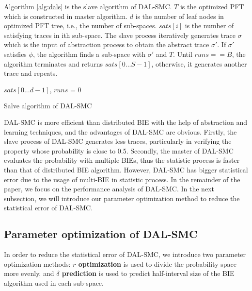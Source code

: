 Algorithm \ref{alg:dals} is the slave algorithm of DAL-SMC. $T$ is the optimized PFT which is constructed in master algorithm. $d$ is the number of leaf nodes in optimized PFT tree, i.e., the number of sub-spaces. $sats[i]$ is the number of satisfying traces in ith sub-space. The slave process iteratively generates trace $\sigma$ which is the input of abstraction process to obtain the abstract trace $\sigma'$. If $\sigma'$ satisfies $\phi$, the algorithm finds a sub-space with $\sigma'$ and $T$. Until $runs == B$, the algorithm terminates and returns $sats[0...S-1]$, otherwise, it generates another trace and repeats.

\begin{algorithm}[t]
{}
$sats[0...d-1]$, $runs$ = 0\;
\caption{Salve algorithm of DAL-SMC}
\label{alg:dals}
\end{algorithm}
DAL-SMC is more efficient than distributed BIE with the help of abstraction and learning techniques, and the advantages of DAL-SMC are obvious. Firstly, the slave process of DAL-SMC generates less traces, particularly in verifying the property whose probability is close to 0.5. Secondly, the master of DAL-SMC evaluates the probability with multiple BIEs, thus the statistic process is faster than that of distributed BIE algorithm. However, DAL-SMC has bigger statistical error due to the usage of multi-BIE in statistic process. In the remainder of the paper, we focus on the performance analysis of DAL-SMC.  In the next subsection, we will introduce our parameter optimization method to reduce the statistical error of DAL-SMC. 


\subsection{Parameter optimization of DAL-SMC}
In order to reduce the statistical error of DAL-SMC, we introduce two parameter optimization methods: \textbf{$r$ optimization} is used to divide the probability space more evenly, and \textbf{$\delta$ prediction} is used to predict half-interval size of the BIE algorithm used in each sub-space.

